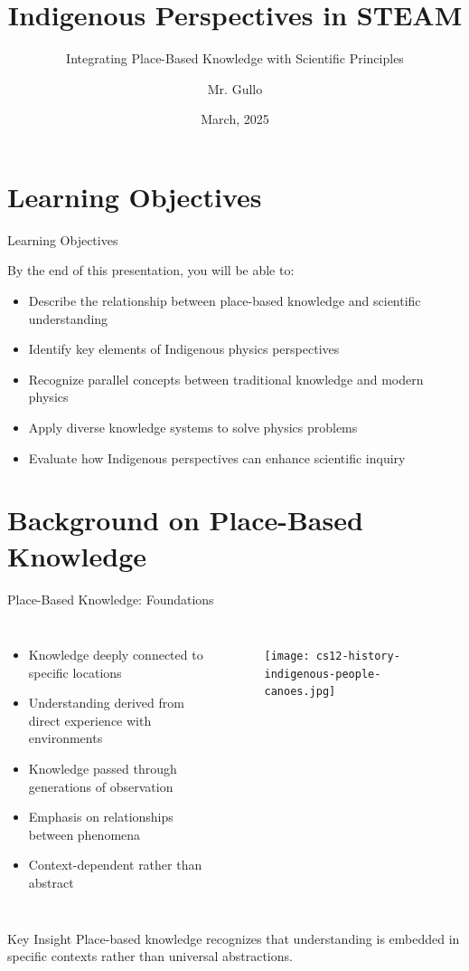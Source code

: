 \documentclass{beamer}
\title[Place-Based Knowledge]{Indigenous Perspectives in STEAM}
\subtitle{Integrating Place-Based Knowledge with Scientific Principles}
\author[Mr. Gullo]{Mr. Gullo}
\institute{Physics Department}
\date[March 2025]{March, 2025}
\begin{document}
\begin{frame}
    \titlepage
\end{frame}

\section{Learning Objectives}

\begin{frame}{Learning Objectives}
    \begin{block}{By the end of this presentation, you will be able to:}
        \begin{itemize}
            \item Describe the relationship between place-based knowledge and scientific understanding
            \item Identify key elements of Indigenous physics perspectives
            \item Recognize parallel concepts between traditional knowledge and modern physics
            \item Apply diverse knowledge systems to solve physics problems
            \item Evaluate how Indigenous perspectives can enhance scientific inquiry
        \end{itemize}
    \end{block}
\end{frame}



\section{Background on Place-Based Knowledge}

\begin{frame}{Place-Based Knowledge: Foundations}
    \begin{columns}
        \begin{itemize}
            \item Knowledge deeply connected to specific locations
            \item Understanding derived from direct experience with environments
            \item Knowledge passed through generations of observation
            \item Emphasis on relationships between phenomena
            \item Context-dependent rather than abstract
        \end{itemize}
        
        \begin{figure}
            \centering
            \texttt{[image: cs12-history-indigenous-people-canoes.jpg]}
        \end{figure}
    \end{columns}
    
    \begin{alertblock}{Key Insight}
        Place-based knowledge recognizes that understanding is embedded in specific contexts rather than universal abstractions.
    \end{alertblock}
\end{frame}
\end{document}
